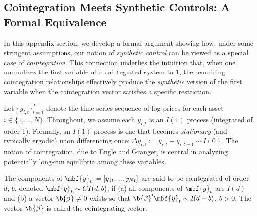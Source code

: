 \subsection{Cointegration Meets Synthetic Controls: A Formal Equivalence}
\label{sec:cointegration_synthetic_controls}

In this appendix section, we develop a formal argument showing how, under some stringent assumptions, our notion of \emph{synthetic control} can be viewed as a special case of \emph{cointegration}. This connection underlies the intuition that, when one normalizes the first variable of a cointegrated system to 1, the remaining cointegration relationships effectively produce the \emph{synthetic} version of the first variable when the cointegration vector satisfies a specific restriction. 


Let $\{y_{i,t} \}_{t=1}^{T}$ denote the time series sequence of log-prices for each asset $i\in\{1,\ldots,N\}$.
%
Throughout, we assume each $y_{i,t}$ is an $I(1)$ process (integrated of order 1). 
%
Formally, an $I(1)$ process is one that becomes \emph{stationary} (and typically ergodic) upon differencing once:
$\Delta y_{i,t} := y_{i,t} - y_{i,t-1} \sim I(0).$
%
The notion of cointegration, due to Engle and Granger, is central in analyzing potentially long-run equilibria among these variables.

\begin{definition}
The components of $\mbf{y}_t:=[y_{1t}, ..., y_{Nt}]$ are said to be cointegrated of order $d$, $b$, denoted $\mbf{y}_t \sim CI(d,b)$, if (a) all components of $\mbf{y}_t$ are $I(d)$ and (b) a vector $\b{\beta}\neq 0$ exists so that $\b{\beta}'\mbf{y}_t \sim I(d-b)$, $b > 0$. The vector $\b{\beta}$ is called the cointegrating vector.
\end{definition}


